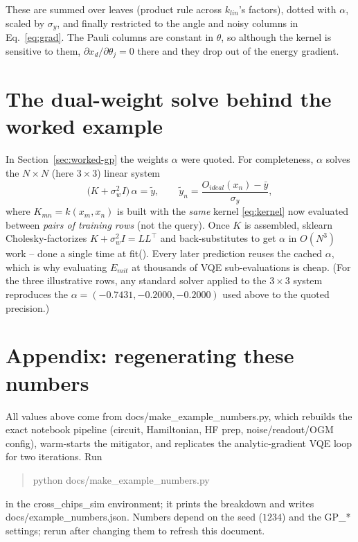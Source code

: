 \documentclass[11pt]{article}
\def\bm#1{#1}%
\def\texttt#1{#1}%
\def\mathrm#1{#1}%
\newcommand{\Emit}{E_{\mathrm{mit}}}
\begin{document}
\noindent
These are summed over leaves (product rule across $k_{\mathrm{lin}}$'s factors),
dotted with $\bm\alpha$, scaled by $\sigma_y$, and finally restricted to the
angle and noisy columns in Eq.~\eqref{eq:grad}. The Pauli columns are constant in
$\bm\theta$, so although the kernel is sensitive to them, $\partial x_d/\partial
\theta_j=0$ there and they drop out of the energy gradient.

\section{The dual-weight solve behind the worked example}
\label{sec:appendix-solve}

In Section~\ref{sec:worked-gp} the weights $\bm\alpha$ were quoted. For
completeness, $\bm\alpha$ solves the $N\times N$ (here $3\times3$) linear system
\begin{equation}
\big(K+\sigma_w^2 I\big)\,\bm\alpha=\tilde{\bm y},\qquad
\tilde y_n=\frac{O_{\mathrm{ideal}}(\bm x_n)-\bar y}{\sigma_y},
\end{equation}
where $K_{mn}=k(\bm x_m,\bm x_n)$ is built with the \emph{same} kernel
\eqref{eq:kernel} now evaluated between \emph{pairs of training rows} (not the
query). Once $K$ is assembled, sklearn Cholesky-factorizes
$K+\sigma_w^2I=LL^{\!\top}$ and back-substitutes to get $\bm\alpha$ in $O(N^3)$
work -- done a single time at \texttt{fit()}. Every later prediction reuses the
cached $\bm\alpha$, which is why evaluating $\Emit$ at thousands of VQE
sub-evaluations is cheap. (For the three illustrative rows, any standard solver
applied to the $3\times3$ system reproduces the
$\bm\alpha=(-0.7431,-0.2000,-0.2000)$ used above to the quoted precision.)

\section*{Appendix: regenerating these numbers}
All values above come from \texttt{docs/make\_example\_numbers.py}, which rebuilds
the exact notebook pipeline (circuit, Hamiltonian, HF prep, noise/readout/OGM
config), warm-starts the mitigator, and replicates the analytic-gradient VQE loop
for two iterations. Run
\begin{quote}\ttfamily
python docs/make\_example\_numbers.py
\end{quote}
in the \texttt{cross\_chips\_sim} environment; it prints the breakdown and writes
\texttt{docs/example\_numbers.json}. Numbers depend on the seed ($1234$) and the
\texttt{GP\_*} settings; rerun after changing them to refresh this document.
\end{document}
